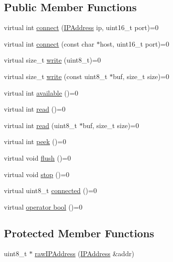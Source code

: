 \subsection*{Public Member Functions}
\begin{DoxyCompactItemize}
\item 
virtual int \hyperlink{class_client_a7b5d23b2df67ab5f84971100f1f9e825}{connect} (\hyperlink{class_i_p_address}{I\+P\+Address} ip, uint16\+\_\+t port)=0
\item 
virtual int \hyperlink{class_client_a475258d5bda463bac8ac60d391377e34}{connect} (const char $\ast$host, uint16\+\_\+t port)=0
\item 
virtual size\+\_\+t \hyperlink{class_client_acde4db2f92186810af3493fd2c7535f0}{write} (uint8\+\_\+t)=0
\item 
virtual size\+\_\+t \hyperlink{class_client_a7565f7448952b08e42489b3162638f69}{write} (const uint8\+\_\+t $\ast$buf, size\+\_\+t size)=0
\item 
virtual int \hyperlink{class_client_aebd60457902debb30b07971a16f24ebd}{available} ()=0
\item 
virtual int \hyperlink{class_client_a4afd50731ba321d1b9be909cb288a50b}{read} ()=0
\item 
virtual int \hyperlink{class_client_a699f8a687f8e4ab1c08cc4ea1da121bc}{read} (uint8\+\_\+t $\ast$buf, size\+\_\+t size)=0
\item 
virtual int \hyperlink{class_client_a9ae768d427519818aa552adf467bf65a}{peek} ()=0
\item 
virtual void \hyperlink{class_client_a50ab71f4bc571f6e246b20db4b3dd131}{flush} ()=0
\item 
virtual void \hyperlink{class_client_a0efff8623a2fb79dad94a96dcf16d966}{stop} ()=0
\item 
virtual uint8\+\_\+t \hyperlink{class_client_a4da62bf6f27e3c10bc4f7b2d92dca244}{connected} ()=0
\item 
virtual \hyperlink{class_client_ac496133545cba767b45c6ce8df3587e7}{operator bool} ()=0
\end{DoxyCompactItemize}
\subsection*{Protected Member Functions}
\begin{DoxyCompactItemize}
\item 
uint8\+\_\+t $\ast$ \hyperlink{class_client_a8a60fab7dbb23ddc33ffa5163daa52b5}{raw\+I\+P\+Address} (\hyperlink{class_i_p_address}{I\+P\+Address} \&addr)
\end{DoxyCompactItemize}
